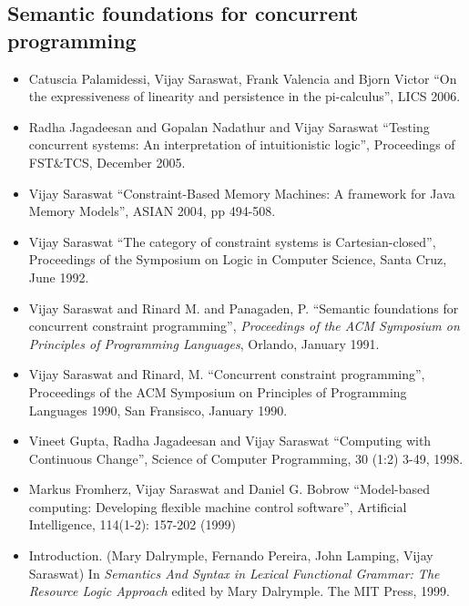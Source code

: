\documentclass{article}
\begin{document}
\subsection*{Semantic foundations for concurrent programming}
\begin{itemize} 

\item Catuscia Palamidessi, Vijay Saraswat, Frank Valencia and Bjorn
Victor ``On the expressiveness of linearity and persistence in the
pi-calculus'', LICS 2006.

\item Radha Jagadeesan and Gopalan Nadathur and Vijay Saraswat
``Testing concurrent systems: An interpretation of intuitionistic
logic'', Proceedings of FST\&TCS, December 2005.

\item Vijay Saraswat ``Constraint-Based Memory Machines: A framework
for Java Memory Models'', ASIAN 2004, pp 494-508.

\item  Vijay Saraswat ``The category of constraint systems is
  Cartesian-closed'', Proceedings of the Symposium on Logic in
  Computer Science, Santa Cruz, June 1992.

\item  Vijay Saraswat and Rinard M. and Panagaden, P. ``Semantic
  foundations for concurrent constraint programming'', \textit{
  Proceedings of the ACM Symposium on Principles of Programming
  Languages}, Orlando, January 1991.
  
\item  Vijay Saraswat and Rinard, M. ``Concurrent constraint
  programming'', Proceedings of the ACM Symposium on
  Principles of Programming Languages 1990, San Fransisco, January
  1990.

\item  Vineet Gupta, Radha Jagadeesan and Vijay Saraswat
  ``Computing with Continuous Change'',  Science of
  Computer Programming, 30 (1:2) 3-49, 1998.

\item  Markus Fromherz, Vijay Saraswat and Daniel G. Bobrow
  ``Model-based computing: Developing flexible machine control
  software'', Artificial Intelligence, 114(1-2): 157-202 (1999)

\item Introduction. (Mary Dalrymple, Fernando Pereira, John Lamping,
   Vijay Saraswat) In \textit{Semantics And Syntax in Lexical Functional
   Grammar: The Resource Logic Approach} edited by Mary Dalrymple. The
   MIT Press, 1999.


\end{itemize}
\end{document}
